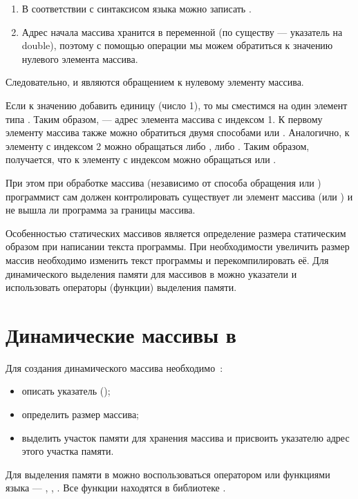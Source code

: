 \begin{enumerate}
\item В соответствии с синтаксисом языка  можно записать .
\item Адрес начала массива хранится в переменной  (по существу --- указатель на
double), поэтому с помощью операции  мы можем обратиться к значению нулевого элемента массива.
\end{enumerate}
Следовательно,  и  являются обращением к
нулевому элементу массива.

Если к значению добавить единицу (число 1), то мы сместимся на один элемент типа .
Таким образом,  --- адрес элемента массива  с индексом 1. К
первому элементу массива  также можно обратиться двумя способами  или
. Аналогично, к элементу с индексом 2 можно обращаться либо , либо
. Таким образом, получается, что к элементу с индексом  можно обращаться
 или . 

При этом при обработке массива (независимо от способа обращения  или )
программист сам должен контролировать существует ли элемент массива  (или
) и не вышла ли программа за границы массива.

Особенностью статических массивов является определение размера статическим образом при написании текста программы. При
необходимости увеличить размер массив необходимо изменить текст программы и перекомпилировать её. Для динамического
выделения памяти для массивов в  можно указатели и использовать операторы (функции) выделения памяти.

\section[Динамические массивы в \Sys{С(С++)}]{Динамические массивы в }
Для создания динамического массива необходимо~\cite{VC++,Shim}:%

\begin{itemize}
\item описать указатель ();
\item определить размер массива;
\item выделить участок памяти для хранения массива и присвоить указателю адрес этого участка памяти.
\end{itemize}
Для выделения памяти в  можно воспользоваться оператором  или функциями языка  ---
, , . Все функции находятся в библиотеке
.

